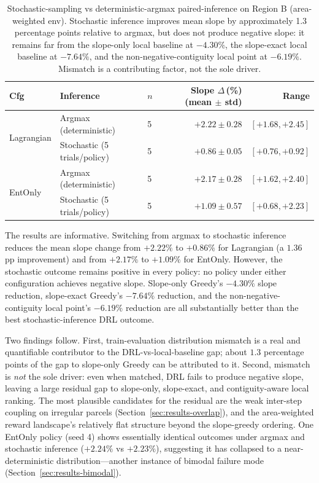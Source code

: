 \documentclass[]{interact}
\theoremstyle{plain}
\begin{document}
\begin{table}[htbp]
\centering
\caption{Stochastic-sampling vs deterministic-argmax paired-inference on Region B (area-weighted env). Stochastic inference improves mean slope by approximately 1.3 percentage points relative to argmax, but does not produce negative slope: it remains far from the slope-only local baseline at $-4.30\%$, the slope-exact local baseline at $-7.64\%$, and the non-negative-contiguity local point at $-6.19\%$. Mismatch is a contributing factor, not the sole driver.}
\label{tab:stochastic}
\begin{tabular}{lllrr}
\toprule
Cfg & Inference & $n$ & Slope $\Delta$\,(\%) (mean $\pm$ std) & Range \\
\midrule
\multirow{2}{*}{Lagrangian} & Argmax (deterministic) & 5 & $+2.22 \pm 0.28$ & $[+1.68, +2.45]$ \\
                            & Stochastic (5 trials/policy) & 5 & $+0.86 \pm 0.05$ & $[+0.76, +0.92]$ \\
\midrule
\multirow{2}{*}{EntOnly}    & Argmax (deterministic) & 5 & $+2.17 \pm 0.28$ & $[+1.62, +2.40]$ \\
                            & Stochastic (5 trials/policy) & 5 & $+1.09 \pm 0.57$ & $[+0.68, +2.23]$ \\
\bottomrule
\end{tabular}
\end{table}

The results are informative. Switching from argmax to stochastic inference reduces the mean slope change from $+2.22\%$ to $+0.86\%$ for Lagrangian (a $1.36$ pp improvement) and from $+2.17\%$ to $+1.09\%$ for EntOnly. However, the stochastic outcome remains positive in every policy: no policy under either configuration achieves negative slope. Slope-only Greedy's $-4.30\%$ slope reduction, slope-exact Greedy's $-7.64\%$ reduction, and the non-negative-contiguity local point's $-6.19\%$ reduction are all substantially better than the best stochastic-inference DRL outcome.

Two findings follow. First, train-evaluation distribution mismatch is a real and quantifiable contributor to the DRL-vs-local-baseline gap; about $1.3$ percentage points of the gap to slope-only Greedy can be attributed to it. Second, mismatch is \emph{not} the sole driver: even when matched, DRL fails to produce negative slope, leaving a large residual gap to slope-only, slope-exact, and contiguity-aware local ranking. The most plausible candidates for the residual are the weak inter-step coupling on irregular parcels (Section~\ref{sec:results-overlap}), and the area-weighted reward landscape's relatively flat structure beyond the slope-greedy ordering. One EntOnly policy (seed 4) shows essentially identical outcomes under argmax and stochastic inference ($+2.24\%$ vs $+2.23\%$), suggesting it has collapsed to a near-deterministic distribution---another instance of bimodal failure mode (Section~\ref{sec:results-bimodal}).
\end{document}
